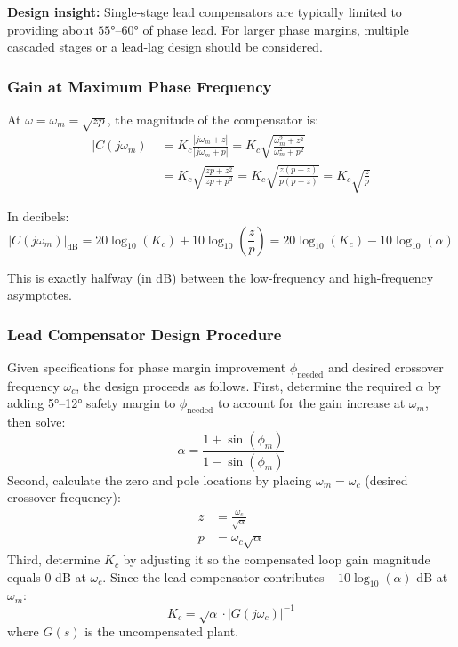 \textbf{Design insight:} Single-stage lead compensators are typically limited to providing about $55°$--$60°$ of phase lead. For larger phase margins, multiple cascaded stages or a lead-lag design should be considered.

\subsubsection{Gain at Maximum Phase Frequency}

At $\omega = \omega_m = \sqrt{zp}$, the magnitude of the compensator is:
\begin{align}
|C(j\omega_m)| &= K_c \frac{|j\omega_m + z|}{|j\omega_m + p|} = K_c \sqrt{\frac{\omega_m^2 + z^2}{\omega_m^2 + p^2}} \\
&= K_c \sqrt{\frac{zp + z^2}{zp + p^2}} = K_c \sqrt{\frac{z(p+z)}{p(p+z)}} = K_c \sqrt{\frac{z}{p}}
\end{align}

In decibels:
\begin{equation}
|C(j\omega_m)|_{\text{dB}} = 20\log_{10}(K_c) + 10\log_{10}\left(\frac{z}{p}\right) = 20\log_{10}(K_c) - 10\log_{10}(\alpha)
\label{eq:gain_at_omega_m}
\end{equation}

This is exactly halfway (in dB) between the low-frequency and high-frequency asymptotes.

\subsubsection{Lead Compensator Design Procedure}

Given specifications for phase margin improvement $\phi_{\text{needed}}$ and desired crossover frequency $\omega_c$, the design proceeds as follows. First, determine the required $\alpha$ by adding 5°--12° safety margin to $\phi_{\text{needed}}$ to account for the gain increase at $\omega_m$, then solve:
\begin{equation}
\alpha = \frac{1 + \sin(\phi_m)}{1 - \sin(\phi_m)}
\label{eq:alpha_from_phi}
\end{equation}
Second, calculate the zero and pole locations by placing $\omega_m = \omega_c$ (desired crossover frequency):
\begin{align}
z &= \frac{\omega_c}{\sqrt{\alpha}} \\
p &= \omega_c \sqrt{\alpha}
\label{eq:zp_from_omega}
\end{align}
Third, determine $K_c$ by adjusting it so the compensated loop gain magnitude equals 0 dB at $\omega_c$. Since the lead compensator contributes $-10\log_{10}(\alpha)$ dB at $\omega_m$:
\begin{equation}
K_c = \sqrt{\alpha} \cdot |G(j\omega_c)|^{-1}
\label{eq:Kc_lead}
\end{equation}
where $G(s)$ is the uncompensated plant.

